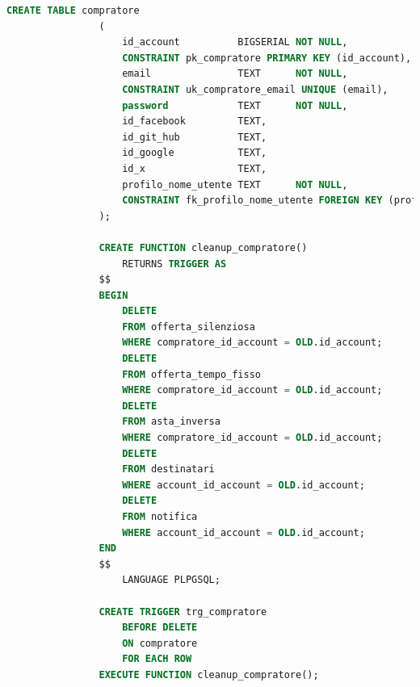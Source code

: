             \begin{lstlisting}[language=SQL, caption=Relazione compratore]
                CREATE TABLE compratore
                (
                    id_account          BIGSERIAL NOT NULL,
                    CONSTRAINT pk_compratore PRIMARY KEY (id_account),
                    email               TEXT      NOT NULL,
                    CONSTRAINT uk_compratore_email UNIQUE (email),
                    password            TEXT      NOT NULL,
                    id_facebook         TEXT,
                    id_git_hub          TEXT,
                    id_google           TEXT,
                    id_x                TEXT,
                    profilo_nome_utente TEXT      NOT NULL,
                    CONSTRAINT fk_profilo_nome_utente FOREIGN KEY (profilo_nome_utente) REFERENCES profilo (nome_utente) ON UPDATE CASCADE ON DELETE CASCADE
                );
                
                CREATE FUNCTION cleanup_compratore()
                    RETURNS TRIGGER AS
                $$
                BEGIN
                    DELETE
                    FROM offerta_silenziosa
                    WHERE compratore_id_account = OLD.id_account;
                    DELETE
                    FROM offerta_tempo_fisso
                    WHERE compratore_id_account = OLD.id_account;
                    DELETE
                    FROM asta_inversa
                    WHERE compratore_id_account = OLD.id_account;
                    DELETE
                    FROM destinatari
                    WHERE account_id_account = OLD.id_account;
                    DELETE
                    FROM notifica
                    WHERE account_id_account = OLD.id_account;
                END
                $$
                    LANGUAGE PLPGSQL;
                
                CREATE TRIGGER trg_compratore
                    BEFORE DELETE
                    ON compratore
                    FOR EACH ROW
                EXECUTE FUNCTION cleanup_compratore();
            \end{lstlisting}
            
